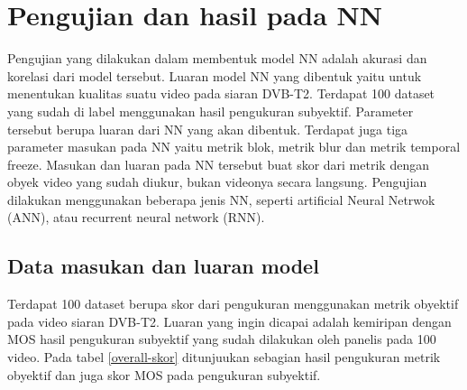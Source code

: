 \section{Pengujian dan hasil pada NN}
\hspace{1,2cm}
Pengujian yang dilakukan dalam membentuk model NN adalah akurasi dan korelasi dari model tersebut. Luaran model NN yang dibentuk yaitu untuk menentukan kualitas suatu video pada siaran DVB-T2. Terdapat 100 dataset yang sudah di label menggunakan hasil pengukuran subyektif. Parameter tersebut berupa luaran dari NN yang akan dibentuk. Terdapat juga tiga parameter masukan pada NN yaitu metrik blok, metrik blur dan metrik temporal freeze. Masukan dan luaran pada NN tersebut buat skor dari metrik dengan obyek video yang sudah diukur, bukan videonya secara langsung. Pengujian dilakukan menggunakan beberapa jenis NN, seperti artificial Neural Netrwok (ANN), atau recurrent neural network (RNN).

\subsection{Data masukan dan luaran model}
\hspace{1,2cm}
Terdapat 100 dataset berupa skor dari pengukuran menggunakan metrik obyektif pada video siaran DVB-T2. Luaran yang ingin dicapai adalah kemiripan dengan MOS hasil pengukuran subyektif yang sudah dilakukan oleh panelis pada 100 video. Pada tabel \ref{overall-skor} ditunjuukan sebagian hasil pengukuran metrik obyektif dan juga skor MOS pada pengukuran subyektif.

